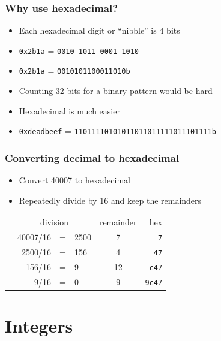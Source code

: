 \documentclass{beamer}
\begin{document}
\begin{frame}
    \frametitle{Why use hexadecimal?}
    \begin{itemize}
        \item Each hexadecimal digit or ``nibble'' is 4 bits
        \item {\tt 0x2b1a} = {\tt 0010 1011 0001 1010}
        \item {\tt 0x2b1a} = {\tt 0010101100011010b}
        \item Counting 32 bits for a binary pattern would be hard
        \item Hexadecimal is much easier
        \item {\tt 0xdeadbeef} = {\tt 11011110101011011011111011101111b}
    \end{itemize}
\end{frame}

\begin{frame}
    \frametitle{Converting decimal to hexadecimal}
            \begin{itemize}
                \item Convert 40007 to hexadecimal
                \item Repeatedly divide by 16 and keep the remainders
            \end{itemize}
\begin{tabular}{lrclcr}
\qquad\qquad & \multicolumn{3}{c}{division} & remainder & hex \\ \cline{2-6}
&40007/16 &=& 2500 & 7 & {\tt 7} \\
&2500/16  &=& 156  & 4 & {\tt 47} \\
&156/16   &=& 9    & 12 & {\tt c47} \\
&9/16     &=& 0    & 9  & {\tt 9c47} \\
\end{tabular}
\end{frame}

\section{Integers}
\end{document}
